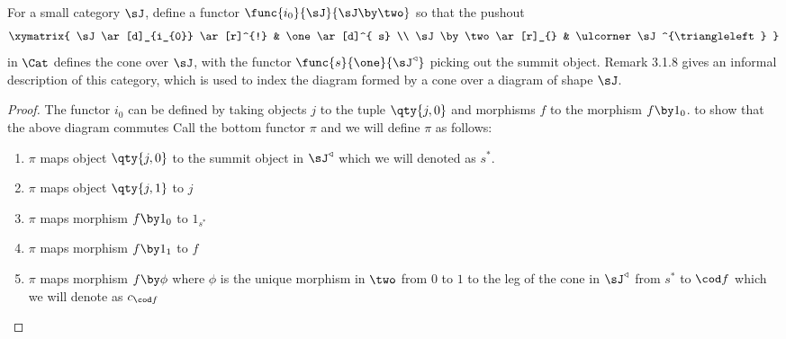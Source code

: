 \documentclass[main.tex]{subfiles}
\begin{document}
\begin{exercise}
	For a small category $\sJ$, define a functor $\func{i_{0}}{\sJ}{\sJ \by \two}$ so that the pushout
	$$\xymatrix{ \sJ  \ar[d]_{i_{0}} \ar[r]^{!} & \one \ar[d]^{ s}  \\    \sJ \by \two \ar[r]_{}  & \ulcorner \sJ^{\triangleleft}  } $$ in $\Cat$ defines the cone over $\sJ$, with the functor $\func{s}{\one}{\sJ^{\triangleleft} }$ picking out the summit object. Remark 3.1.8 gives an informal description of this category, which is used to index the diagram formed by a cone over a diagram of shape $\sJ$.
\end{exercise}

\begin{proof}
	The functor  $i_{0}$ can be defined by taking objects $j$ to the tuple $\qty{j,0}$ and morphisms $f$ to the morphism $f \by 1_{0}$. to show that the above diagram commutes Call the bottom functor $\pi$ and we will define $\pi$ as follows:
	\begin{enumerate}
		\item $\pi$ maps object $\qty{j,0}$ to the summit object in $\sJ^{\triangleleft} $ which we will denoted as $s^{*}$.
		\item $\pi$ maps object $\qty{j,1}$ to $j$
		\item $\pi$ maps morphism $f\by1_{0}$ to $1_{s^{*}}$
		\item $\pi$ maps morphism $f \by 1_{1}$ to $f$
		\item $\pi$ maps morphism $f \by \phi$ where $\phi$ is the unique morphism in $\two$ from $0$ to $1$ to the leg of the cone in $\sJ^{\triangleleft} $ from $s^{*}$ to $\cod f$ which we will denote as $c_{\cod f}$
	\end{enumerate}


\end{proof}
\end{document}
